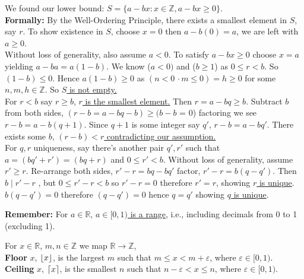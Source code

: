 \begin{Proof} 
    \noindent
    We found our lower bound: \Large{$S=\{a-bx:x\in\mathbb{Z}, a-bx\geq0\}$.}\\

    \normalsize
    \noindent
    \textbf{Formally:} By the Well-Ordering Principle, there exists a smallest element in $S$, say $r$.
    To show existence in $S$, choose $x=0$ then $a-b(0)=a$, we are left with $a\geq 0$.\\

    \noindent
    Without loss of generality, also assume $a<0$. To satisfy $a-bx\geq0$ choose $x=a$ yielding
    $a-ba=a(1-b)$. We know ($a<0)$ and ($b\geq1$) as $0\leq r <b$. So $(1-b)\leq0$. Hence
    $a(1-b)\geq0$ as $(n<0\,\cdot m\leq0)=h\geq0$ for some $n,m,h\in\mathbb{Z}$. So \underline{$S$ is not empty.}\\

    \noindent
    For \underline{$r<b$} say $r\geq b$, \underline{$r$ is the smallest element.} Then $r=a-bq\geq b$. Subtract $b$ from both sides,
    $(r-b=a-bq-b)\geq (b-b$ = 0) factoring we see $r-b=a-b(q+1)$. Since
    $q+1$ is some integer say $q'$, $r-b=a-bq'$. There exists some $b$, \underline{$(r-b)<r$ contradicting our assumption.}\\

        \noindent
        For $q,r$ uniqueness, say there's another pair $q',r'$ such that
    $a=(bq'+r')=(bq+r)$ and $0\leq r'<b$. Without loss of generality, assume $r'\geq r$.
        Re-arrange both sides, $r'-r=bq-bq'$ factor, $r'-r=b(q-q')$. Then $b\mid r'-r$
        , but $0\leq r'-r<b$ so $r'-r=0$ therefore $r'=r$, showing \underline{$r$ is unique}.
    $b(q-q')=0$ therefore $(q-q')=0$ hence $q=q'$ showing \underline{$q$ is unique}.
\end{Proof}

\newpage

\noindent
\textbf{Remember:} For $a\in\mathbb{R}$, \underline {$a\in[0,1)$ is a range}, i.e., including decimals from 0 to 1 (excluding 1).\\

\begin{Def}

    \label{def:floor_ceiling}

    For $x\in\mathbb{R}$, $m,n\in\mathbb{Z}$ we map $\mathbb{R}\rightarrow\mathbb{Z}$,\\

    \noindent
    \textbf{Floor} $x$, $\lfloor x\rfloor$, is the largest $m$ such that $m\leq x<m+\varepsilon$, where $\varepsilon\in[0,1)$.\\

    \vspace{-.5em}
    \noindent
    \textbf{Ceiling} $x$, $\lceil x\rceil$, is the smallest $n$ such that $n-\varepsilon<x\leq n$, where $\varepsilon\in[0,1)$.\\


\end{Def}
\noindent

